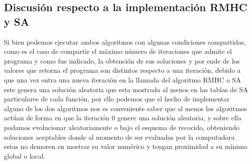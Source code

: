 \documentclass[10pt]{article}
\begin{document}
\subsection{Discusión respecto a la implementación RMHC y SA}
Si bien podemos ejecutar ambos algoritmos con algunas condiciones compartidas, como es el caso de compartir el máximo número de iteraciones que admite el programa y como fue indicado, la obtención de sus soluciones y por ende de los valores que retorna el programa son distintos respecto a una iteración, debido a que una vez entra una nueva iteración en la llamada del algoritmo RMHC o SA este genera una solución aleatoria que esta mostrada al menos en las tablas de SA particulares de cada función, por ello podemos que el hecho de implementar alguno de los dos algoritmos nos es conveniente saber que al menos los algoritmos actúan de forma en que la iteración $0$ genere una solución aleatoria, y sobre ella podamos evolucionar aleatoriamente o bajo el esquema de recocido, obteniendo soluciones aceptables donde al momento de ser evaluadas por la computadora estas no demoren en mostrar su valor numérico y tengan proximidad a su mínimo global o local.
\end{document}
